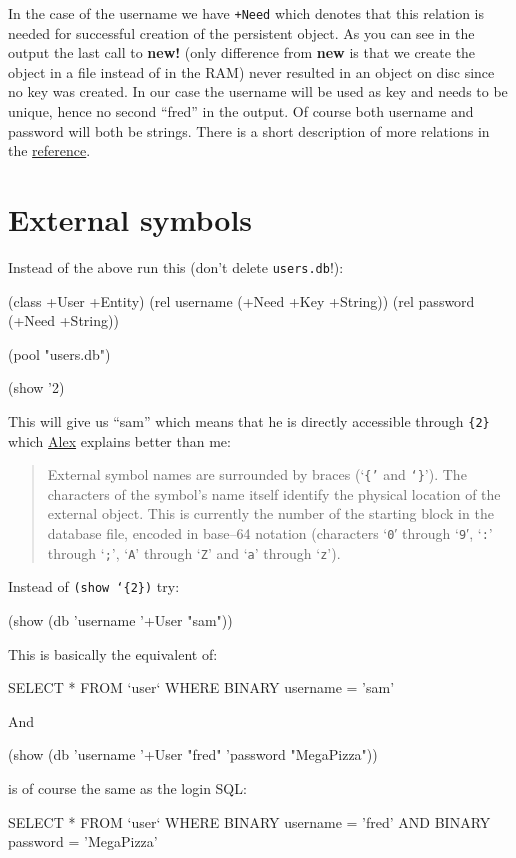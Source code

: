 In the case of the username we have \texttt{+Need} which denotes that
this relation is needed for successful creation of the persistent
object. As you can see in the output the last call to \textbf{new!}
(only difference from \textbf{new} is that we create the object in a
file instead of in the RAM) never resulted in an object on disc since
no key was created. In our case the username will be used as key and
needs to be unique, hence no second ``fred'' in the output. Of course
both username and password will both be strings. There is a short
description of more relations in the
\href{http://www.software-lab.de/ref.html#dbase}{reference}.

\section{External symbols}
\label{sec:simple-oodb-external-symbols}

Instead of the above run this (don't delete \texttt{users.db}!):

\begin{wideverbatim}
(class +User +Entity)
(rel username (+Need +Key +String))
(rel password (+Need +String))

(pool "users.db")

(show '{2})
\end{wideverbatim}


This will give us ``sam'' which means that he is directly accessible
through \texttt{\{2\}} which
\href{http://www.software-lab.de/ref.html#external-io}{Alex} explains
better than me:

\begin{quote}
  External symbol names are surrounded by braces (`\texttt{\{'} and
  \texttt{`\}}'). The characters of the symbol's name itself identify
  the physical location of the external object. This is currently the
  number of the starting block in the database file, encoded in
  base--64 notation (characters `\texttt{0}′ through ‘\texttt{9}′,
  ‘\texttt{:}' through ‘\texttt{;}', `\texttt{A}' through `\texttt{Z}'
  and `\texttt{a}' through `\texttt{z}').
\end{quote}

Instead of \texttt{(show ‘\{2\})} try:


\begin{wideverbatim}
(show (db 'username '+User "sam"))
\end{wideverbatim}

This is basically the equivalent of:

\begin{wideverbatim}
SELECT * FROM `user` WHERE BINARY username = 'sam'
\end{wideverbatim}

And

\begin{wideverbatim}
(show (db 'username '+User "fred" 'password "MegaPizza"))
\end{wideverbatim}

is of course the same as the login SQL:

\begin{wideverbatim}
SELECT * FROM `user` WHERE BINARY username = 'fred' 
AND BINARY password = 'MegaPizza'
\end{wideverbatim}
